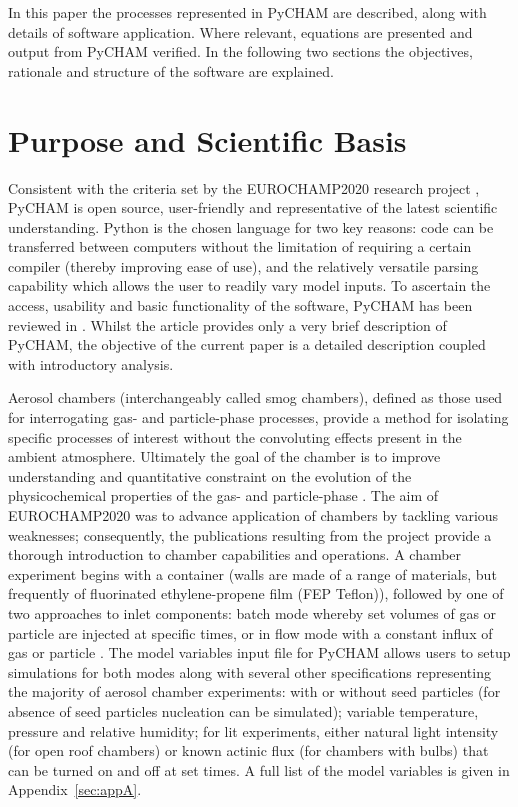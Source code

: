 \documentclass[gmd, manuscript]{copernicus}
\begin{document}
In this paper the processes represented in PyCHAM are described, along with details of software application.  Where relevant, equations are presented and output from PyCHAM verified.  In the following two sections the objectives, rationale and structure of the software are explained.

\section{Purpose and Scientific Basis}\label{sec:purp}

Consistent with the criteria set by the EUROCHAMP2020 research project \citep{EUROCHAMP2020}, PyCHAM is open source, user-friendly and representative of the latest scientific understanding.  Python is the chosen language for two key reasons: code can be transferred between computers without the limitation of requiring a certain compiler (thereby improving ease of use), and the relatively versatile parsing capability which allows the user to readily vary model inputs.  To ascertain the access, usability and basic functionality of the software, PyCHAM has been reviewed in \citet{OMeara2020}.  Whilst the \citet{OMeara2020} article provides only a very brief description of PyCHAM, the objective of the current paper is a detailed description coupled with introductory analysis.

Aerosol chambers (interchangeably called smog chambers), defined as those used for interrogating gas- and particle-phase processes, provide a method for isolating specific processes of interest without the convoluting effects present in the ambient atmosphere.  Ultimately the goal of the chamber is to improve understanding and quantitative constraint on the evolution of the physicochemical properties of the gas- and particle-phase \citep{Schwantes2017, Charan2019, Hidy2019}.  The aim of EUROCHAMP2020 was to advance application of chambers by tackling various weaknesses; consequently, the publications \citep{EUROCHAMP2020} resulting from the project provide a thorough introduction to chamber capabilities and operations.  A chamber experiment begins with a container (walls are made of a range of materials, but frequently of fluorinated ethylene-propene film (FEP Teflon)), followed by one of two approaches to inlet components: batch mode whereby set volumes of gas or particle are injected at specific times, or in flow mode with a constant influx of gas or particle \citep{Jaoui2014}.  The model variables input file for PyCHAM allows users to setup simulations for both modes along with several other specifications representing the majority of aerosol chamber experiments: with or without seed particles (for absence of seed particles nucleation can be simulated); variable temperature, pressure and relative humidity; for lit experiments, either natural light intensity (for open roof chambers) or known actinic flux (for chambers with bulbs) that can be turned on and off at set times.  A full list of the model variables is given in Appendix~\ref{sec:appA}.
\end{document}
